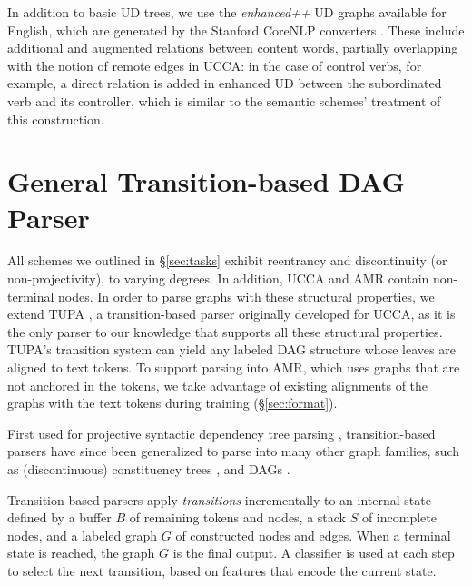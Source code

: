 \documentclass[11pt,a4paper]{article}
\begin{document}
In addition to basic UD trees, we use the \textit{enhanced++} UD graphs available for English,
which are generated by the Stanford CoreNLP converters \cite{SCHUSTER16.779}.
These include additional and augmented relations between content words,
partially overlapping with the notion of remote edges in UCCA:
in the case of control verbs, for example, a direct relation is added in 
enhanced UD between the subordinated verb and its controller,
which is similar to the semantic schemes' treatment of this construction.


\section{General Transition-based DAG Parser}\label{sec:model}

All schemes we outlined in \S\ref{sec:tasks} exhibit
reentrancy and discontinuity (or non-projectivity), to varying degrees.
In addition, UCCA and AMR contain non-terminal nodes.
In order to parse graphs with these structural properties,
we extend TUPA \cite[henceforth HAR17]{hershcovich2017a}, 
a transition-based parser 
originally developed for UCCA,
as it is the only parser to our knowledge that supports 
all these structural properties.
TUPA's transition system can yield any labeled DAG structure
whose leaves are aligned to text tokens.
To support parsing into AMR, which uses graphs that are not anchored in the tokens,
 we take advantage of existing alignments of the graphs with the text
tokens during training (\S\ref{sec:format}).

First used for projective syntactic dependency tree parsing \cite{Nivre03anefficient},
transition-based parsers have since been generalized to parse into many other
graph families, such as (discontinuous) constituency trees \cite[e.g., ][]{zhang2009transition,maier-lichte:2016:DiscoNLP},
and DAGs \cite[e.g.,][]{sagae2008shift,du-EtAl:2015:SemEval}. %

Transition-based parsers apply \textit{transitions}
incrementally to an internal state defined by a buffer $B$ of remaining tokens 
and nodes, a stack $S$ of incomplete nodes, and a labeled graph $G$ of 
constructed nodes and edges.
When a terminal state is reached, the graph $G$ is the final output.
A classifier is used at each step to select the next transition, 
based on features that encode the current state.
\end{document}
